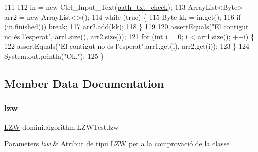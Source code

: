 \begin{DoxyCode}
111 
112         in = \textcolor{keyword}{new} Ctrl\_Input\_Text(\hyperlink{classdomini_1_1algorithm_1_1LZWTest_add9dbf2d86413bf9f7bcdd23b268c288}{path\_txt\_check});
113         ArrayList<Byte> arr2 = \textcolor{keyword}{new} ArrayList<>();
114         \textcolor{keywordflow}{while} (\textcolor{keyword}{true}) \{
115             Byte kk = in.get();
116             \textcolor{keywordflow}{if} (in.finished()) \textcolor{keywordflow}{break};
117             arr2.add(kk);
118         \}
119         
120         assertEquals(\textcolor{stringliteral}{"El contigut no és l'esperat"}, arr1.size(), arr2.size());
121         \textcolor{keywordflow}{for} (\textcolor{keywordtype}{int} i = 0; i < arr1.size(); ++i) \{
122             assertEquals(\textcolor{stringliteral}{"El contigut no és l'esperat"},arr1.get(i), arr2.get(i));
123         \}
124         System.out.println(\textcolor{stringliteral}{"Ok."});
125     \}
\end{DoxyCode}


\subsection{Member Data Documentation}
\mbox{\label{classdomini_1_1algorithm_1_1LZWTest_a591c1bb9b927631d0e60a2853e502d20}} 
\subsubsection{\texorpdfstring{lzw}{lzw}}
{\footnotesize\ttfamily \hyperlink{classdomini_1_1algorithm_1_1LZW}{L\+ZW} domini.\+algorithm.\+L\+Z\+W\+Test.\+lzw\hspace{0.3cm}{\ttfamily [private]}}


\begin{DoxyParams}{Parameters}
{\em lzw} & Atribut de tipu \hyperlink{classdomini_1_1algorithm_1_1LZW}{L\+ZW} per a la comprovació de la classe \\
\hline
\end{DoxyParams}
\mbox{\label{classdomini_1_1algorithm_1_1LZWTest_af5091e6df88845c585e92165f2fae2dc}} 
